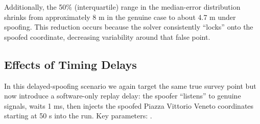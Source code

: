         \vspace{0.2cm}
        
        \noindent Additionally, the 50\% (interquartile) range in the median-error distribution shrinks from approximately 8 m in the genuine case to about 4.7 m under spoofing. 
        This reduction occurs because the solver consistently “locks” onto the spoofed coordinate, decreasing variability around that false point.

    \subsection{Effects of Timing Delays}

        In this delayed-spoofing scenario we again target the same true survey point but now introduce a software-only replay delay: the spoofer “listens” to genuine signals, waits 1 ms, then injects the spoofed Piazza Vittorio Veneto coordinates starting at 50 s into the run. 
        Key parameters: .

